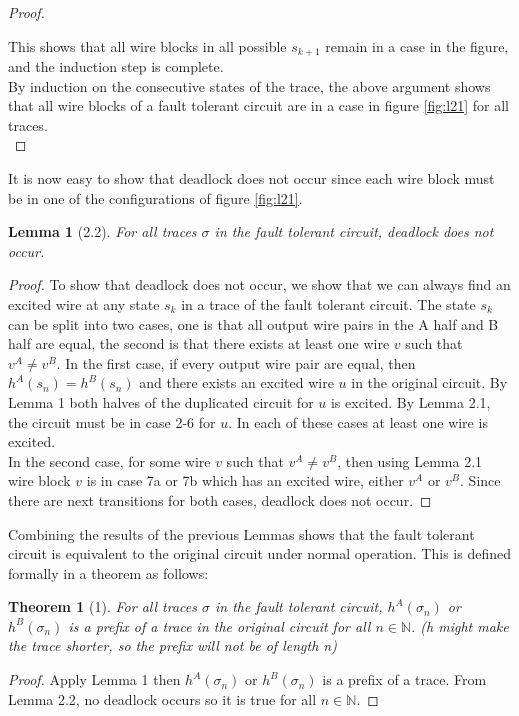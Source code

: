 \documentclass[12pt]{report}
\newtheorem*{theorem}{Theorem}
\newtheorem*{lemma}{Lemma}
\begin{document}
\begin{proof}
\begin{itemize}
\end{itemize}
This shows that all wire blocks in all possible $s_{k+1}$ remain in a case in the figure, and the induction step is complete.\\
By induction on the consecutive states of the trace, the above argument shows that all wire blocks of a fault tolerant circuit are in a case in figure \ref{fig:l21} for all traces. \\
\end{proof}
It is now easy to show that deadlock does not occur since each wire block must be in one of the configurations of figure \ref{fig:l21}.
\begin{lemma}[2.2]
For all traces $\sigma$ in the fault tolerant circuit, deadlock does not occur.
\end{lemma}
\begin{proof}
To show that deadlock does not occur, we show that we can always find an excited wire at any state $s_k$ in a trace of the fault tolerant circuit.  The state $s_k$ can be split into two cases, one is that all output wire pairs in the A half and B half are equal, the second is that there exists at least one wire $v$ such that $v^A\neq v^B$.  In the first case, if every output wire pair are equal, then $h^A(s_n)=h^B(s_n)$ and there exists an excited wire $u$ in the original circuit.  By Lemma 1 both halves of the duplicated circuit for $u$ is excited.  By Lemma 2.1, the circuit must be in case 2-6 for $u$.  In each of these cases at least one wire is excited.  \\
In the second case, for some wire $v$ such that $v^A\neq v^B$, then using Lemma 2.1 wire block $v$ is in case 7a or 7b which has an excited wire, either $v^A$ or $v^B$.  Since there are next transitions for both cases, deadlock does not occur.
\end{proof}

Combining the results of the previous Lemmas shows that the fault tolerant circuit is equivalent to the original circuit under normal operation.  This is defined formally in a theorem as follows:
\begin{theorem}[1]
For all traces $\sigma$ in the fault tolerant circuit, $h^{A}(\sigma_n)$ or $h^{B}(\sigma_n)$ is a prefix of a trace in the original circuit for all $n \in \mathbb{N}$.  (h might make the trace shorter, so the prefix will not be of length n) %
\end{theorem}
\begin{proof}
Apply Lemma 1 then $h^{A}(\sigma_n)$ or $h^{B}(\sigma_n)$ is a prefix of a trace.  From Lemma 2.2, no deadlock occurs so it is true for all $n\in \mathbb{N}$.
\end{proof}
\end{document}
